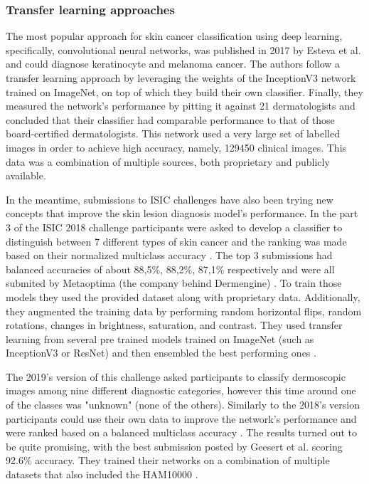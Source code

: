 \subsubsection{Transfer learning approaches}
The most popular approach for skin cancer classification using deep learning, specifically, convolutional neural networks, was published in 2017 by Esteva et al.\cite{Esteva2017} and could diagnose keratinocyte and melanoma cancer. The authors follow a transfer learning approach by leveraging the weights of the InceptionV3 network trained on ImageNet, on top of which they build their own classifier. Finally, they measured the network's performance by pitting it against 21 dermatologists and concluded that their classifier had comparable performance to that of those board-certified dermatologists. This network used a very large set of labelled images in order to achieve high accuracy, namely, 129450 clinical images. This data was a combination of multiple sources, both proprietary and publicly available. \par
In the meantime, submissions to ISIC challenges have also been trying new concepts that improve the skin lesion diagnosis model's performance. In the part 3 of the ISIC 2018 challenge participants were asked to develop a classifier to distinguish between 7 different types of skin cancer and the ranking was made based on their normalized multiclass accuracy \cite{isic2018}. The top 3 submissions had balanced accuracies of about 88,5\%, 88,2\%, 87,1\% respectively and were all submited by Metaoptima (the company behind Dermengine) \cite{isic2018top3}. To train those models they used the provided dataset along with proprietary data. Additionally, they augmented the training data by performing random horizontal flips, random rotations, changes in brightness, saturation, and contrast. They used transfer learning from several pre trained models trained on ImageNet (such as InceptionV3 or ResNet) and then ensembled the best performing ones \cite{isic2018top3}. \par
The 2019's version of this challenge asked participants to classify dermoscopic images among nine different diagnostic categories, however this time around one of the classes was "unknown" (none of the others). Similarly to the 2018's version participants could use their own data to improve the network's performance and were ranked based on a balanced multiclass accuracy \cite{isic2019}. The results turned out to be quite promising, with the best submission posted by Geesert et al. \cite{isic2019first} scoring 92.6\% accuracy. They trained their networks on a combination of multiple datasets that also included the HAM10000 \cite{ham10000}. \par
